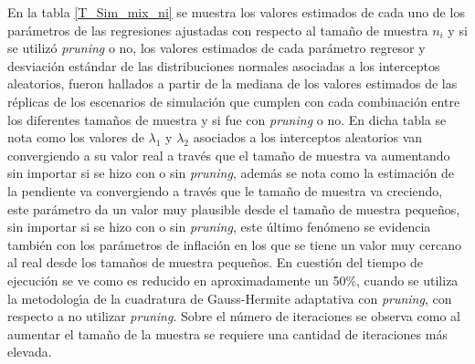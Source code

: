 En la tabla \ref{T_Sim_mix_ni} se muestra los valores estimados de cada uno de los par\'{a}metros de las regresiones ajustadas con respecto al tama\~{n}o de muestra $n_i$ y si se utiliz\'{o} \textit{pruning} o no, los valores estimados de cada par\'{a}metro regresor y desviaci\'{o}n est\'{a}ndar de las distribuciones normales asociadas a los interceptos aleatorios, fueron hallados a partir de la mediana de los valores estimados de las r\'{e}plicas de los escenarios de simulaci\'{o}n que cumplen con cada combinaci\'{o}n entre los diferentes tama\~{n}os de muestra y si fue con \textit{pruning} o no. En dicha tabla se nota como los valores de $\lambda_1$ y $\lambda_2$ asociados a los interceptos aleatorios van convergiendo a su valor real a trav\'{e}s que el tama\~{n}o de muestra va aumentando sin importar si se hizo con o sin \textit{pruning}, adem\'{a}s se nota como la estimaci\'{o}n de la pendiente va convergiendo a trav\'{e}s que le tama\~{n}o de muestra va creciendo, este par\'{a}metro da un valor muy plausible desde el tama\~{n}o de muestra peque\~{n}os, sin importar si se hizo con o sin \textit{pruning}, este \'{u}ltimo fen\'{o}meno se evidencia tambi\'{e}n con los par\'{a}metros de inflaci\'{o}n en los que se tiene un valor muy cercano al real desde los tama\~{n}os de muestra peque\~{n}os. En cuesti\'{o}n del tiempo de ejecuci\'{o}n se ve como es reducido en aproximadamente un 50\%, cuando se utiliza la metodolog\'{\i}a de la cuadratura de Gauss-Hermite adaptativa con \textit{pruning}, con respecto a no utilizar \textit{pruning}. Sobre el n\'{u}mero de iteraciones se observa como al aumentar el tama\~{n}o de la muestra se requiere una cantidad de iteraciones m\'{a}s elevada.\\

